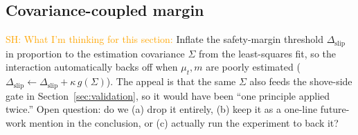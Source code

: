 \documentclass[10pt, conference]{IEEEtran}
\newcommand{\sh}[1]{\textcolor{orange}{SH: #1}}
\begin{document}
\subsection{Covariance-coupled margin}

\sh{What I'm thinking for this section:} Inflate the safety-margin threshold $\Delta_{\mathrm{slip}}$ in proportion to the estimation covariance $\Sigma$ from the least-squares fit, so the interaction automatically backs off when $\mu_t,m$ are poorly estimated ($\Delta_{\mathrm{slip}} \leftarrow \Delta_{\mathrm{slip}} + \kappa\,g(\Sigma)$). The appeal is that the same $\Sigma$ also feeds the shove-side gate in Section~\ref{sec:validation}, so it would have been ``one principle applied twice.'' Open question: do we (a) drop it entirely, (b) keep it as a one-line future-work mention in the conclusion, or (c) actually run the experiment to back it?



\end{document}
